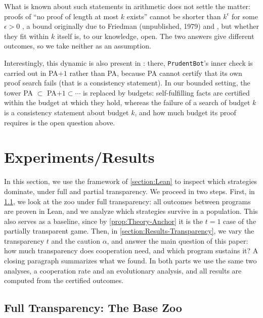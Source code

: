 \documentclass[twoside,11pt]{article}
\begin{document}
What is known about such statements in arithmetic does not settle the matter: proofs of \enquote{no proof of length at most $k$ exists} cannot be shorter than $k^{\epsilon}$ for some $\epsilon > 0$ \citep[Thm.~3.1]{Pudlak_Survey}, a bound originally due to Friedman (unpublished, 1979) and \citet{Pudlak_bounds_for_finite_proofs}, but whether they fit within $k$ itself is, to our knowledge, open. The two answers give different outcomes, so we take neither as an assumption.

Interestingly, this dynamic is also present in \citet{Modal_agents_barasz}: there, \texttt{PrudentBot}'s inner check is carried out in PA${+}1$ rather than PA, because PA cannot certify that its own proof search fails (that is a consistency statement). In our bounded setting, the tower PA $\subset$ PA${+}1 \subset \cdots$ is replaced by budgets: self-fulfilling facts are certified within the budget at which they hold, whereas the failure of a search of budget $k$ is a consistency statement about budget $k$, and how much budget its proof requires is the open question above.


\section{Experiments/Results}
In this section, we use the framework of \cref{section:Lean} to inspect which strategies dominate, under full and partial transparency. We proceed in two steps. First, in \cref{section:Results-Base}, we look at the zoo under full transparency: all outcomes between programs are proven in Lean, and we analyze which strategies survive in a population. This also serves as a baseline, since by \cref{prop:Theory-Anchor} it is the $t = 1$ case of the partially transparent game. Then, in \cref{section:Results-Transparency}, we vary the transparency $t$ and the caution $\alpha$, and answer the main question of this paper: how much transparency does cooperation need, and which program sustains it? A closing paragraph summarizes what we found. In both parts we use the same two analyses, a cooperation rate and an evolutionary analysis, and all results are computed from the certified outcomes.

\subsection{Full Transparency: The Base Zoo}
\label{section:Results-Base}

\end{document}
